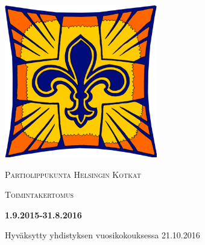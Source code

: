 \begin{titlepage}
	\centering
	\includegraphics[width=0.5\textwidth]{kuvat/heko.png}\par\vspace{1cm}
	{\scshape\LARGE Partiolippukunta Helsingin Kotkat \par}
	\vspace{1cm}
	{\scshape\Large Toimintakertomus\par}
	\vspace{1.5cm}
	{\huge\bfseries 1.9.2015-31.8.2016\par}
	\vspace{2cm}
	\vfill
	\vfill
	{\large Hyväksytty yhdistyksen vuosikokouksessa 21.10.2016}
\end{titlepage}
\tableofcontents
\newpage

